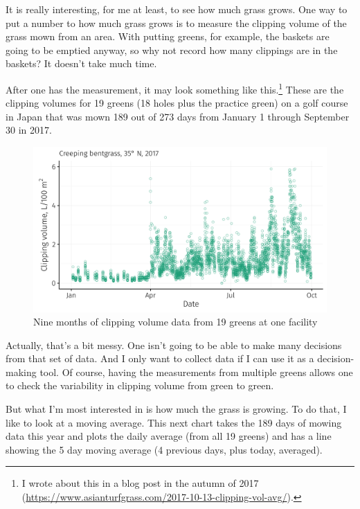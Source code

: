 \documentclass[12pt,b5,]{tufte-book}
\begin{document}
It is really interesting, for me at least, to see how much grass grows. One way to put a number to how much grass grows is to measure the clipping volume of the grass mown from an area. With putting greens, for example, the baskets are going to be emptied anyway, so why not record how many clippings are in the baskets? It doesn't take much time.

After one has the measurement, it may look something like this.\footnote{I wrote about this in a blog post in the autumn of 2017 (\url{https://www.asianturfgrass.com/2017-10-13-clipping-vol-avg/}).} These are the clipping volumes for 19 greens (18 holes plus the practice green) on a golf course in Japan that was mown 189 out of 273 days from January 1 through September 30 in 2017.

\begin{figure}
\centering
\includegraphics{img/b8-1.png}
\caption{Nine months of clipping volume data from 19 greens at one facility}
\end{figure}

Actually, that's a bit messy. One isn't going to be able to make many decisions from that set of data. And I only want to collect data if I can use it as a decision-making tool. Of course, having the measurements from multiple greens allows one to check the variability in clipping volume from green to green.

But what I'm most interested in is how much the grass is growing. To do that, I like to look at a moving average. This next chart takes the 189 days of mowing data this year and plots the daily average (from all 19 greens) and has a line showing the 5 day moving average (4 previous days, plus today, averaged).
\end{document}
